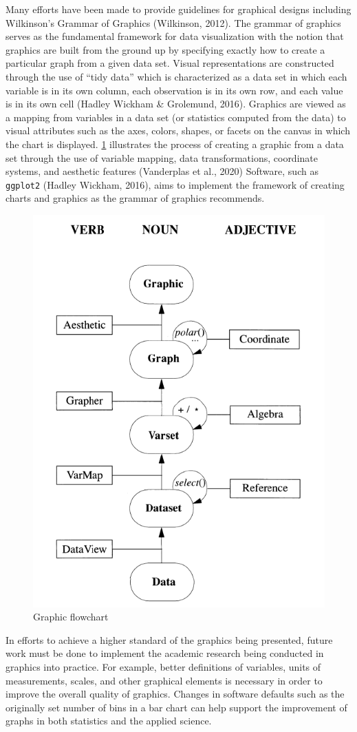 \documentclass[print]{nuthesis}
\begin{document}
Many efforts have been made to provide guidelines for graphical designs including Wilkinson's Grammar of Graphics (Wilkinson, 2012).
The grammar of graphics serves as the fundamental framework for data visualization with the notion that graphics are built from the ground up by specifying exactly how to create a particular graph from a given data set.
Visual representations are constructed through the use of ``tidy data'' which is characterized as a data set in which each variable is in its own column, each observation is in its own row, and each value is in its own cell (Hadley Wickham \& Grolemund, 2016).
Graphics are viewed as a mapping from variables in a data set (or statistics computed from the data) to visual attributes such as the axes, colors, shapes, or facets on the canvas in which the chart is displayed.
\cref{fig:graphic-flowchart} illustrates the process of creating a graphic from a data set through the use of variable mapping, data transformations, coordinate systems, and aesthetic features (Vanderplas et al., 2020)
Software, such as \texttt{ggplot2} (Hadley Wickham, 2016), aims to implement the framework of creating charts and graphics as the grammar of graphics recommends.

\begin{figure}[tbp]

{\centering \includegraphics[width=0.5\linewidth,]{images/graphic-flowchart} 

}

\caption{Graphic flowchart}\label{fig:graphic-flowchart}
\end{figure}

In efforts to achieve a higher standard of the graphics being presented, future work must be done to implement the academic research being conducted in graphics into practice.
For example, better definitions of variables, units of measurements, scales, and other graphical elements is necessary in order to improve the overall quality of graphics.
Changes in software defaults such as the originally set number of bins in a bar chart can help support the improvement of graphs in both statistics and the applied science.
\end{document}
